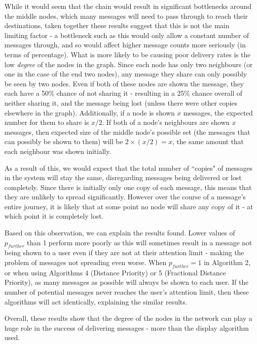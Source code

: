 \documentclass[bsc,frontabs,twoside,singlespacing,parskip,deptreport]{infthesis}     %
\begin{document}
While it would seem that the chain would result in significant bottlenecks around the middle nodes, which many messages will need to pass through to reach their destinations, taken together these results suggest that this is not the main limiting factor - a bottleneck such as this would only allow a constant number of messages through, and so would affect higher message counts more seriously (in terms of percentage). What is more likely to be causing poor delivery rates is the low \textit{degree} of the nodes in the graph. Since each node has only two neighbours (or one in the case of the end two nodes), any message they share can only possibly be seen by two nodes. Even if both of these nodes are shown the message, they each have a 50\% chance of not sharing it - resulting in a 25\% chance overall of neither sharing it, and the message being lost (unless there were other copies elsewhere in the graph). Additionally, if a node is shown $x$ messages, the expected number for them to share is $x/2$. If both of a node's neighbours are shown $x$ messages, then expected size of the middle node's possible set (the messages that can possibly be shown to them) will be $2 \times (x/2) = x$, the same amount that each neighbour was shown initially.

As a result of this, we would expect that the total number of ``copies" of messages in the system will stay the same, disregarding messages being delivered or lost completely. Since there is initially only one copy of each message, this means that they are unlikely to spread significantly. However over the course of a message's entire journey, it is likely that at some point no node will share any copy of it - at which point it is completely lost.

Based on this observation, we can explain the results found. Lower values of $p_{further}$ than 1 perform more poorly as this will sometimes result in a message not being shown to a user even if they are not at their attention limit - making the problem of messages not spreading even worse. When $p_{further}=1$ in Algorithm 2, or when using Algorithms 4 (Distance Priority) or 5 (Fractional Distance Priority), as many messages as possible will always be shown to each user. If the number of potential messages never reaches the user's attention limit, then these algorithms will act identically, explaining the similar results.

Overall, these results show that the degree of the nodes in the network can play a huge role in the success of delivering messages - more than the display algorithm used.
\end{document}

